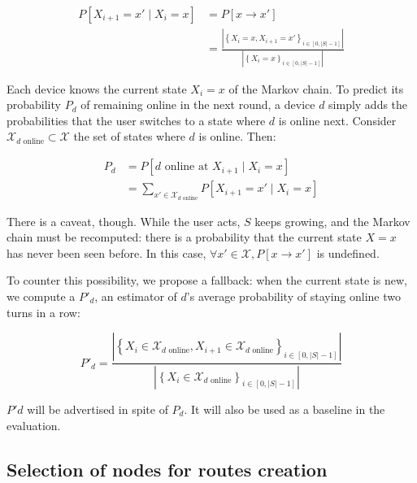 \begin{align*}
P\left[X_{i+1}=x' \mid X_i=x \right] &= P\left[x \rightarrow x' \right] \\&= \frac{\left| \left\{ X_i = x, X_{i+1} = x' \right\}_{i \in \left[0, |S| - 1\right]} \right|}{\left| \left\{ X_i = x \right\}_{i \in \left[0, |S| - 1\right]} \right|}
\end{align*}

Each device knows the current state $X_i=x$ of the Markov chain.
To predict its probability $P_d$ of remaining online in the next round, 
a device $d$ simply adds the probabilities that the user switches to a state where $d$ is online next.
Consider $\mathcal{X}_{d\text{ online}} \subset \mathcal{X}$ the set of states where $d$ is online. Then:

\begin{align*}
P_d & = P\left[d\text{ online at }X_{i+1} \mid X_i=x\right] \\ & = \sum\limits_{x' \in \mathcal{X}_{d\text{ online}}} P\left[ X_{i+1}=x' \mid X_i=x \right]
\end{align*}

There is a caveat, though.
While the user acts, $S$ keeps growing, and the Markov chain must be recomputed: there is a probability that the current state $X=x$ has never been seen before.
In this case, $\forall x' \in \mathcal{X}, P\left[x \rightarrow x'\right]$ is undefined.

To counter this possibility, we propose a fallback:
when the current state is new, we compute a $P'_d$, an estimator of $d$'s average probability of staying online two turns in a row:

$$ P'_d = \frac{\left| \left\{ X_i \in \mathcal{X}_{d\text{ online}}, X_{i+1} \in \mathcal{X}_{d\text{ online}} \right\}_{i \in \left[0, |S| - 1\right]} \right|}{\left| \left\{ X_i \in \mathcal{X}_{d\text{ online}} \right\}_{i \in \left[0, |S| - 1\right]} \right|} $$

$P'd$ will be advertised in spite of $P_d$. It will also be used as a baseline in the evaluation.

\subsection{Selection of nodes for routes creation}
\label{ssec:por}

